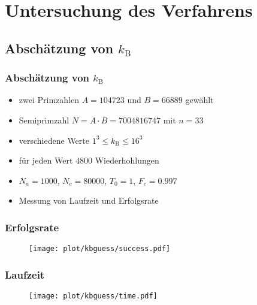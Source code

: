\section{Untersuchung des Verfahrens}

\subsection*{\texorpdfstring{Abschätzung von $k_\mathrm{B}$}{Abschätzung von kB}}
\begin{frame}
  \frametitle{Abschätzung von $k_\mathrm{B}$}
  \begin{itemize}
    \setlength{\itemsep}{0.3cm}

    \item zwei Primzahlen $A=104723$ und $B=66889$ gewählt
    \item Semiprimzahl $N=A\cdot B=7004816747$ mit $n=33$
    \pause{}
    \item verschiedene Werte $1^3\leq k_\mathrm{B}\leq 16^3$
    \item für jeden Wert $4800$ Wiederhohlungen
    \pause{}
    \item $N_a=1000$, $N_c=80000$, $T_0=1$, $F_c=0.997$
    \item Messung von Laufzeit und Erfolgsrate
  \end{itemize}
\end{frame}
\begin{frame}
  \frametitle{Erfolgsrate}
  \begin{figure}[H]
    \centering
    \texttt{[image: plot/kbguess/success.pdf]}
  \end{figure}
\end{frame}
\begin{frame}
  \frametitle{Laufzeit}
  \begin{figure}[H]
    \centering
    \texttt{[image: plot/kbguess/time.pdf]}
  \end{figure}
\end{frame}

